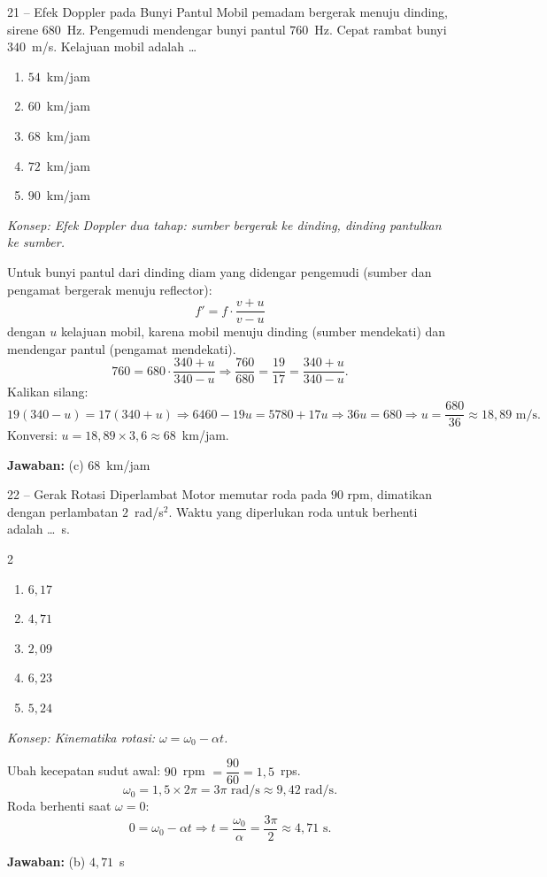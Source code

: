 \documentclass[11pt]{article}
\newcommand{\jawaban}[1]{%
  \noindent\colorbox{gold!30}{\parbox{\dimexpr\linewidth-2\fboxsep\relax}{%
    \textbf{Jawaban:} #1}}\par\smallskip}
\newcommand{\konsep}[1]{\textit{Konsep: #1.}\par\smallskip}
\newenvironment{pil}{%
  \begin{enumerate}[label=(\alph*),leftmargin=*,itemsep=1pt,topsep=3pt]}%
  {\end{enumerate}}
\newenvironment{pilB}{%
  \par\smallskip\begin{multicols}{2}
  \begin{enumerate}[label=(\alph*),leftmargin=*,itemsep=1pt,topsep=3pt]}%
  {\end{enumerate}\end{multicols}}
\begin{document}
\begin{soal}{21 -- Efek Doppler pada Bunyi Pantul}
Mobil pemadam bergerak menuju dinding, sirene $680$~Hz. Pengemudi mendengar bunyi pantul
$760$~Hz. Cepat rambat bunyi $340$~m/s. Kelajuan mobil adalah \ldots
\begin{pil}
  \item $54$~km/jam \item $60$~km/jam \item $68$~km/jam \item $72$~km/jam \item $90$~km/jam
\end{pil}
\end{soal}
\begin{pembox}
\konsep{Efek Doppler dua tahap: sumber bergerak ke dinding, dinding pantulkan ke sumber}
Untuk bunyi pantul dari dinding diam yang didengar pengemudi (sumber dan pengamat bergerak menuju reflector):
\[
f' = f\cdot\frac{v+u}{v-u}
\]
dengan $u$ kelajuan mobil, karena mobil menuju dinding (sumber mendekati) dan mendengar pantul (pengamat mendekati).
\[
760 = 680\cdot\frac{340+u}{340-u}
\Rightarrow \frac{760}{680} = \frac{19}{17} = \frac{340+u}{340-u}.
\]
Kalikan silang:
\[
19(340-u) = 17(340+u)
\Rightarrow 6460 - 19u = 5780 + 17u
\Rightarrow 36u = 680
\Rightarrow u = \frac{680}{36} \approx 18{,}89\text{ m/s}.
\]
Konversi: $u = 18{,}89 \times 3{,}6 \approx 68$~km/jam.
\jawaban{(c) $68$~km/jam}
\end{pembox}

\begin{soal}{22 -- Gerak Rotasi Diperlambat}
Motor memutar roda pada $90$ rpm, dimatikan dengan perlambatan $2$~rad/s$^2$.
Waktu yang diperlukan roda untuk berhenti adalah \ldots~s.
\begin{pilB}
  \item $6{,}17$ \item $4{,}71$ \item $2{,}09$ \item $6{,}23$ \item $5{,}24$
\end{pilB}
\end{soal}
\begin{pembox}
\konsep{Kinematika rotasi: $\omega=\omega_0-\alpha t$}
Ubah kecepatan sudut awal: $90$~rpm $= \dfrac{90}{60} = 1{,}5$~rps.
\[
\omega_0 = 1{,}5 \times 2\pi = 3\pi\text{ rad/s} \approx 9{,}42\text{ rad/s}.
\]
Roda berhenti saat $\omega=0$:
\[
0 = \omega_0 - \alpha t
\Rightarrow t = \frac{\omega_0}{\alpha} = \frac{3\pi}{2} \approx 4{,}71\text{ s}.
\]
\jawaban{(b) $4{,}71$~s}
\end{pembox}
\end{document}
